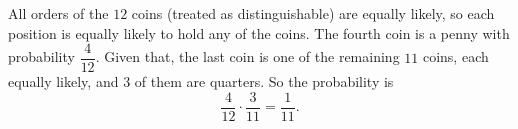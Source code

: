 All orders of the $12$ coins (treated as distinguishable) are equally likely, so each position is equally likely to hold any of the coins. The fourth coin is a penny with probability $\dfrac{4}{12}$. Given that, the last coin is one of the remaining $11$ coins, each equally likely, and $3$ of them are quarters. So the probability is
\[\dfrac{4}{12}\cdot\dfrac{3}{11}=\boxed{\dfrac{1}{11}}.\]
